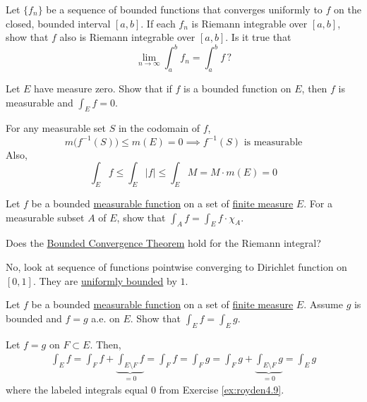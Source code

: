   \begin{exercise}[Royden 4.8]
    Let $\{f_n\}$ be a sequence of bounded functions that converges uniformly to $f$ on the closed, bounded interval $[a, b]$. If each $f_n$ is Riemann integrable over $[a, b]$, show that $f$ also is Riemann integrable over $[a, b]$. Is it true that
    \begin{equation*}
      \lim_{n \to \infty} \int_a^b f_n = \int_a^b f \, ?
    \end{equation*}
  \end{exercise}

  \begin{exercise}[Royden 4.9][ex:royden4.9]
    Let $E$ have measure zero. Show that if $f$ is a bounded function on $E$, then $f$ is measurable and $\int_E f = 0$.
  \end{exercise}
  \begin{solution}
    For any measurable set $S$ in the codomain of $f$, 
    \begin{equation}
      m\big( f^{-1} (S) \big) \leq m(E) = 0 \implies f^{-1} (S) \text{ is measurable}
    \end{equation}
    Also, 
    \begin{equation}
      \int_E f \leq \int_E |f| \leq \int_E M = M \cdot m(E) = 0
    \end{equation}
  \end{solution}

  \begin{exercise}[Royden 4.10]
    Let $f$ be a bounded \hyperref[def:measurable-function]{measurable function} on a set of \hyperref[def:finite-measure]{finite measure} $E$. For a measurable subset $A$ of $E$, show that $\int_A f = \int_E f \cdot \chi_A$.
  \end{exercise}

  \begin{exercise}[Royden 4.11]
    Does the \hyperref[thm:bounded-convergence-theorem]{Bounded Convergence Theorem} hold for the Riemann integral?
  \end{exercise}
  \begin{solution}
    No, look at sequence of functions pointwise converging to Dirichlet function on $[0, 1]$. They are \hyperref[real-def:uniformly-bounded]{uniformly bounded} by $1$. 
  \end{solution}

  \begin{exercise}[Royden 4.12]
    Let $f$ be a bounded \hyperref[def:measurable-function]{measurable function} on a set of \hyperref[def:finite-measure]{finite measure} $E$. Assume $g$ is bounded and $f = g$ a.e. on $E$. Show that $\int_E f = \int_E g$.
  \end{exercise}
  \begin{solution}
    Let $f = g$ on $F \subset E$. Then, 
    \begin{align}
      \int_E f = \int_F f + \underbrace{\int_{E \setminus F} f}_{= 0} = \int_F f = \int_F g = \int_F g + \underbrace{\int_{E \setminus F} g}_{= 0} = \int_E g
    \end{align}
    where the labeled integrals equal $0$ from Exercise \ref{ex:royden4.9}. 
  \end{solution}

